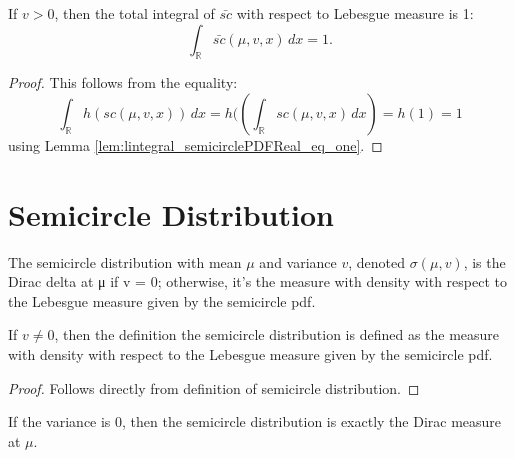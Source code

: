\begin{lemma}
  \leanok
  \label{lem:lintegral_semicirclePDF_eq_one}
  If $v > 0$, then the total integral of $\bar{sc}$ with respect to Lebesgue measure is 1:
  \[
      \int_{\mathbb{R}} \bar{sc}(\mu,v,x) \, dx = 1.
  \]
\end{lemma}
\begin{proof}
  \leanok
  This follows from the equality:
  \[
  \int_{\mathbb{R}} h(sc(\mu,v,x)) \, dx = h( \left( \int_{\mathbb{R}} sc(\mu,v,x) \, dx \right) = h(1) = 1
  \]
  using Lemma \ref{lem:lintegral_semicirclePDFReal_eq_one}.
\end{proof}



\section{Semicircle Distribution}




\begin{definition}
  \label{def:semicircleReal}
  \leanok
  The semicircle distribution with mean $\mu$ and variance $v$, denoted $\sigma(\mu, v)$, is the Dirac delta at μ if v = 0; otherwise, it's the measure with density with respect to the Lebesgue measure given by the semicircle pdf.
\end{definition}

\begin{lemma}
  \label{lem:semicircleReal_of_var_ne_zero}
  \leanok
  If $v \neq 0$, then the definition the semicircle distribution is defined as the measure with density with respect to the Lebesgue measure given by the semicircle pdf.
\end{lemma}

\begin{proof}
  \leanok
  Follows directly from definition of semicircle distribution.
\end{proof}

\begin{lemma}
  \label{lem:semicircleReal_zero_var}
  \leanok
  If the variance is 0, then the semicircle distribution is exactly the Dirac measure at $\mu$.
\end{lemma}

